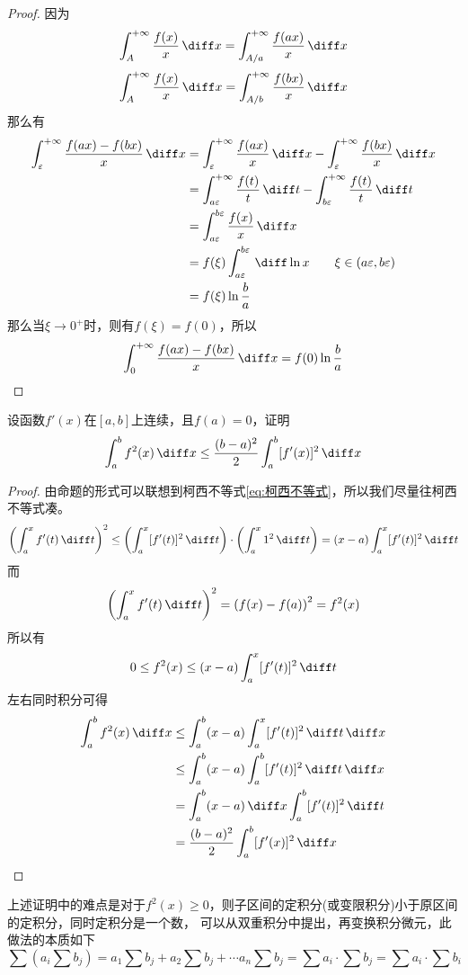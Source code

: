\begin{proof}
    因为
    \[ \int_A^{+\infty}\frac{f(x)}{x}\,\diff x = \int_{A/a}^{+\infty} \frac{f(ax)}{x}\,\diff x \]
    \[ \int_A^{+\infty}\frac{f(x)}{x}\,\diff x = \int_{A/b}^{+\infty} \frac{f(bx)}{x}\,\diff x \]
    那么有
    \begin{align*}
        \int_\varepsilon^{+\infty} \frac{f(ax)-f(bx)}{x}\,\diff x
         & = \int_\varepsilon^{+\infty} \frac{f(ax)}{x}\,\diff x - \int_\varepsilon^{+\infty}\frac{f(bx)}{x}\,\diff x     \\
         & = \int_{a\varepsilon}^{+\infty} \frac{f(t)}{t}\,\diff t - \int_{b\varepsilon}^{+\infty}\frac{f(t)}{t}\,\diff t \\
         & = \int_{a\varepsilon}^{b\varepsilon} \frac{f(x)}{x}\,\diff x                                                   \\
         & = f(\xi)\int_{a\varepsilon}^{b\varepsilon} \,\diff \ln x \qquad \xi\in(a\varepsilon,b\varepsilon)              \\
         & = f(\xi)\ln\frac{b}{a} \qquad                                                                                  \\
    \end{align*}
    那么当$\xi\to 0^+$时，则有$f(\xi)=f(0)$，所以
    \[
        \int_0^{+\infty}\frac{f(ax)-f(bx)}{x}\,\diff x = f(0)\ln\frac{b}{a}
    \]
\end{proof}

\begin{example}
    设函数$f'(x)$在$[a,b]$上连续，且$f(a)=0$，证明
    \[ \int_a^b f^2(x)\,\diff x \leq \frac{(b-a)^2}{2}\int_a^b[f'(x)]^2\,\diff x \]
\end{example}
\begin{proof}
    由命题的形式可以联想到柯西不等式\ref{eq:柯西不等式}，所以我们尽量往柯西不等式凑。
    \[
        \left(\int_a^x f'(t)\,\diff t\right)^2
        \leq
        \left(\int_a^x [f'(t)]^2\,\diff t\right)\cdot\left(\int_a^x 1^2\,\diff t\right)
        =
        (x-a)\int_a^x [f'(t)]^2\,\diff t
    \]
    而
    \[ \left(\int_a^x f'(t)\,\diff t\right)^2 = \left(f(x)-f(a)\right)^2 = f^2(x) \]
    所以有
    \[ 0 \leq f^2(x) \leq (x-a)\int_a^x [f'(t)]^2\,\diff t \]
    左右同时积分可得
    \begin{align*}
        \int_a^b f^2(x)\,\diff x
         & \leq
        \int_a^b (x-a)\int_a^x [f'(t)]^2\,\diff t\,\diff x  \\
         & \leq
        \int_a^b (x-a)\int_a^b [f'(t)]^2\,\diff t\,\diff x  \\
         & =
        \int_a^b (x-a)\,\diff x \int_a^b [f'(t)]^2\,\diff t \\
         & =
        \frac{(b-a)^2}{2} \int_a^b [f'(x)]^2\,\diff x
    \end{align*}
\end{proof}
上述证明中的难点是对于$f^2(x)\geq 0$，则子区间的定积分(或变限积分)小于原区间的定积分，同时定积分是一个数，
可以从双重积分中提出，再变换积分微元，此做法的本质如下
\[ \sum \left(a_i\sum b_j\right) = a_1\sum b_j + a_2\sum b_j + \cdots a_n\sum b_j = \sum a_i\cdot\sum b_j = \sum a_i\cdot\sum b_i \]

